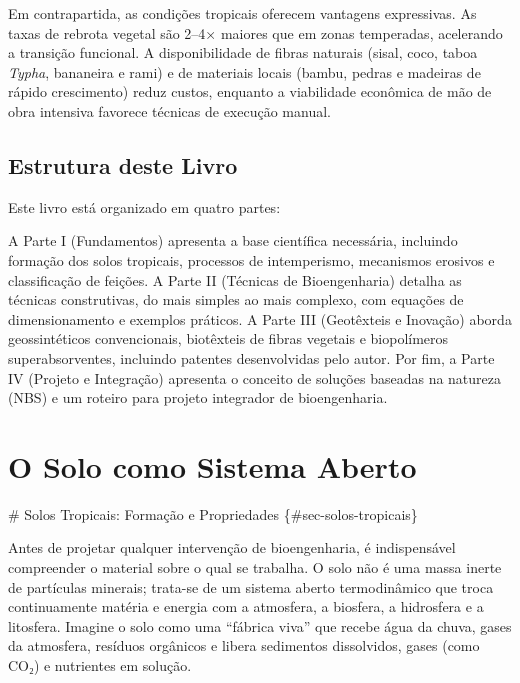 \documentclass[
  portuguese,
  11pt,
  a4paper,
  open=any]{scrbook}
\begin{document}
\begin{tcolorbox}[enhanced jigsaw, leftrule=.75mm, colframe=quarto-callout-tip-color-frame, colback=white, bottomrule=.15mm, opacityback=0, colbacktitle=quarto-callout-tip-color!10!white, breakable, bottomtitle=1mm, opacitybacktitle=0.6, title=\textcolor{quarto-callout-tip-color}{\faLightbulb}\hspace{0.5em}{Oportunidades tropicais}, titlerule=0mm, toprule=.15mm, toptitle=1mm, rightrule=.15mm, left=2mm, arc=.35mm, coltitle=black]

Em contrapartida, as condições tropicais oferecem vantagens expressivas.
As taxas de rebrota vegetal são 2--4× maiores que em zonas temperadas,
acelerando a transição funcional. A disponibilidade de fibras naturais
(sisal, coco, taboa \emph{Typha}, bananeira e rami) e de materiais
locais (bambu, pedras e madeiras de rápido crescimento) reduz custos,
enquanto a viabilidade econômica de mão de obra intensiva favorece
técnicas de execução manual.

\end{tcolorbox}

\section{Estrutura deste Livro}\label{estrutura-deste-livro}

Este livro está organizado em quatro partes:

A Parte I (Fundamentos) apresenta a base científica necessária,
incluindo formação dos solos tropicais, processos de intemperismo,
mecanismos erosivos e classificação de feições. A Parte II (Técnicas de
Bioengenharia) detalha as técnicas construtivas, do mais simples ao mais
complexo, com equações de dimensionamento e exemplos práticos. A Parte
III (Geotêxteis e Inovação) aborda geossintéticos convencionais,
biotêxteis de fibras vegetais e biopolímeros superabsorventes, incluindo
patentes desenvolvidas pelo autor. Por fim, a Parte IV (Projeto e
Integração) apresenta o conceito de soluções baseadas na natureza (NBS)
e um roteiro para projeto integrador de bioengenharia.

\chapter{O Solo como Sistema Aberto}\label{o-solo-como-sistema-aberto}

\# Solos Tropicais: Formação e Propriedades \{\#sec-solos-tropicais\}

Antes de projetar qualquer intervenção de bioengenharia, é indispensável
compreender o material sobre o qual se trabalha. O solo não é uma massa
inerte de partículas minerais; trata-se de um sistema aberto
termodinâmico que troca continuamente matéria e energia com a atmosfera,
a biosfera, a hidrosfera e a litosfera. Imagine o solo como uma
``fábrica viva'' que recebe água da chuva, gases da atmosfera, resíduos
orgânicos e libera sedimentos dissolvidos, gases (como CO₂) e nutrientes
em solução.
\end{document}
